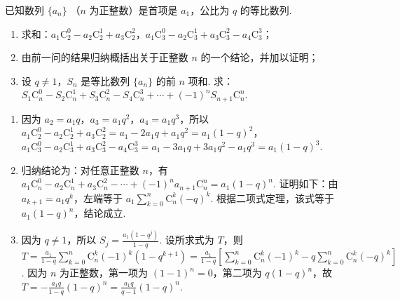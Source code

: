 \begin{problem}
已知数列 \(\{a_{n}\}\) （\(n\) 为正整数）是首项是 \(a_{1}\)，公比为 \(q\) 的等比数列.

\begin{enumerate}
\item 求和：\(a_{1}\mathrm C_{2}^{0} - a_{2}\mathrm C_{2}^{1} + a_{3}\mathrm C_{2}^{2}\)，\(a_{1}\mathrm C_{3}^{0} - a_{2}\mathrm C_{3}^{1} + a_{3}\mathrm C_{3}^{2} - a_{4}\mathrm C_{3}^{3}\)；
\item 由前一问的结果归纳概括出关于正整数 \(n\) 的一个结论，并加以证明；
\item 设 \(q \neq 1\)，\(S_n\) 是等比数列 \(\{a_n\}\) 的前 \(n\) 项和. 求：\(S_1\mathrm C_n^0 - S_2\mathrm C_n^1 + S_3\mathrm C_n^2 - S_4\mathrm C_n^3 + \cdots + (-1)^n S_{n+1}\mathrm C_n^n\).
\end{enumerate}
\end{problem}

\begin{solution}
\begin{enumerate}
\item 因为 \(a_2=a_1q\)，\(a_3=a_1q^2\)，\(a_4=a_1q^3\)，所以 \(a_1\mathrm C_2^0-a_2\mathrm C_2^1+a_3\mathrm C_2^2=a_1-2a_1q+a_1q^2=a_1(1-q)^2\)，\(a_1\mathrm C_3^0-a_2\mathrm C_3^1+a_3\mathrm C_3^2-a_4\mathrm C_3^3=a_1-3a_1q+3a_1q^2-a_1q^3=a_1(1-q)^3\).
\item 归纳结论为：对任意正整数 \(n\)，有 \(a_1\mathrm C_n^0-a_2\mathrm C_n^1+a_3\mathrm C_n^2-\cdots+(-1)^n a_{n+1}\mathrm C_n^n=a_1(1-q)^n\). 证明如下：由 \(a_{k+1}=a_1q^k\)，左端等于 \(a_1\sum_{k=0}^{n}\mathrm C_n^k(-q)^k\). 根据二项式定理，该式等于 \(a_1(1-q)^n\)，结论成立.
\item 因为 \(q\ne1\)，所以 \(S_j=\frac{a_1(1-q^j)}{1-q}\). 设所求式为 \(T\)，则 \(T=\frac{a_1}{1-q}\sum_{k=0}^{n}\mathrm C_n^k(-1)^k(1-q^{k+1})=\frac{a_1}{1-q}\left[\sum_{k=0}^{n}\mathrm C_n^k(-1)^k-q\sum_{k=0}^{n}\mathrm C_n^k(-q)^k\right]\). 因为 \(n\) 为正整数，第一项为 \((1-1)^n=0\)，第二项为 \(q(1-q)^n\)，故 \(T=-\frac{a_1q}{1-q}(1-q)^n=\frac{a_1q}{q-1}(1-q)^n\).
\end{enumerate}
\end{solution}

